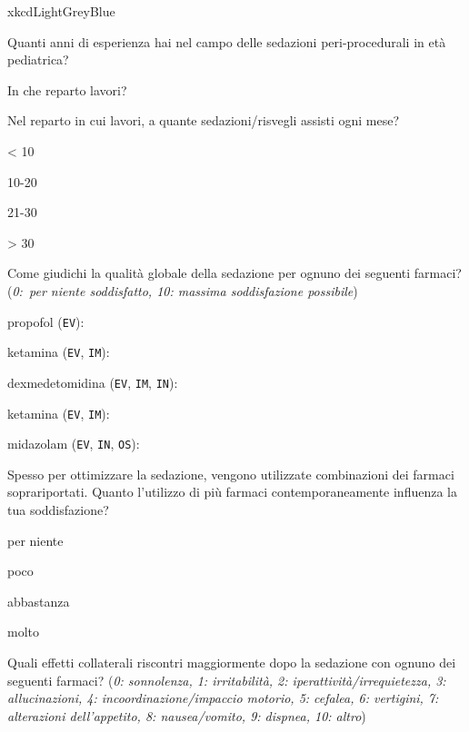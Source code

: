 \begin{survey}{xkcdLightGreyBlue}
    
       \Query Quanti anni di esperienza hai nel campo delle sedazioni peri-procedurali in età pediatrica? 
       
       \Query In che reparto lavori? 
       
       \Query Nel reparto in cui lavori, a quante sedazioni/risvegli assisti ogni mese?
       \begin{Qlist}
           \item < 10
           \item 10-20
           \item 21-30
           \item > 30
       \end{Qlist}
       
\newpage

       \Query Come giudichi la qualità globale della sedazione per ognuno dei seguenti farmaci? (\emph{0:~per niente soddisfatto, 10: massima soddisfazione possibile})
       
       propofol (\texttt{EV}): \hfill {} 
    
       ketamina (\texttt{EV}, \texttt{IM}): \hfill {}
    
        dexmedetomidina (\texttt{EV}, \texttt{IM}, \texttt{IN}): \hfill {}
    
        ketamina (\texttt{EV}, \texttt{IM}): \hfill {}
    
        midazolam (\texttt{EV}, \texttt{IN}, \texttt{OS}): \hfill {}
    
       \Query Spesso per ottimizzare la sedazione, vengono utilizzate combinazioni dei farmaci soprariportati. Quanto l'utilizzo di più farmaci contemporaneamente influenza la tua soddisfazione?
       \begin{Qlist}
           \item per niente
           \item poco
           \item abbastanza
           \item molto
       \end{Qlist}
       
       \Query Quali effetti collaterali riscontri maggiormente dopo la sedazione con ognuno dei seguenti farmaci? (\emph{0: sonnolenza, 1: irritabilità, 2: iperattività/irrequietezza, 3: allucinazioni, 4: incoordinazione/impaccio motorio, 5: cefalea, 6: vertigini, 7: alterazioni dell’appetito, 8: nausea/vomito, 9: dispnea, 10: altro})
       

\end{survey}
